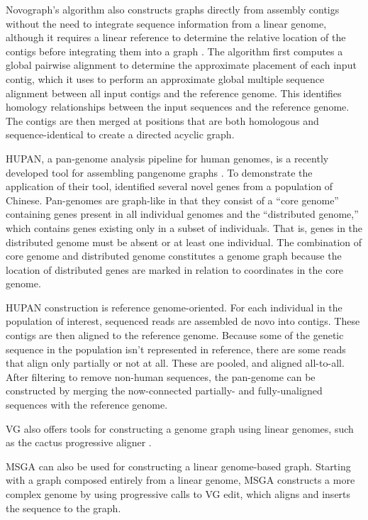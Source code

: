 Novograph's algorithm also constructs graphs directly from assembly contigs without the need to integrate sequence information from a linear genome, although it requires a linear reference to determine the relative location of the contigs before integrating them into a graph \cite{Biederstedt2018}. 
The algorithm first computes a global pairwise alignment to determine the approximate placement of each input contig, which it uses to perform an approximate global multiple sequence alignment between all input contigs and the reference genome.
This identifies homology relationships between the input sequences and the reference genome.
The contigs are then merged at positions that are both homologous and sequence-identical to create a directed acyclic graph.

 
HUPAN, a pan-genome analysis pipeline for human genomes, is a recently developed tool for assembling pangenome graphs \cite{Duan_2019}. 
To demonstrate the application of their tool, \citep{Duan_2019} identified several novel genes from a population of Chinese.
Pan-genomes are graph-like in that they consist of a ``core genome'' containing genes present in all individual genomes and the ``distributed genome,'' which contains genes existing only in a subset of individuals.
That is, genes in the distributed genome must be absent or at least one individual.
The combination of core genome and distributed genome constitutes a genome graph because the location of distributed genes are marked in relation to coordinates in the core genome.

HUPAN construction is reference genome-oriented.
For each individual in the population of interest, sequenced reads are assembled de novo into contigs.
These contigs are then aligned to the reference genome.
Because some of the genetic sequence in the population isn't represented in reference, there are some reads that align only partially or not at all.
These are pooled, and aligned all-to-all.
After filtering to remove non-human sequences, the pan-genome can be constructed by merging the now-connected partially- and fully-unaligned sequences with the reference genome.

VG also offers tools for constructing a genome graph using linear genomes, such as the cactus progressive aligner \cite{Garrison_2018}.

MSGA can also be used for constructing a linear genome-based graph.
Starting with a graph composed entirely from a linear genome, MSGA constructs a more complex genome by using progressive calls to VG edit, which aligns and inserts the sequence to the graph.  

